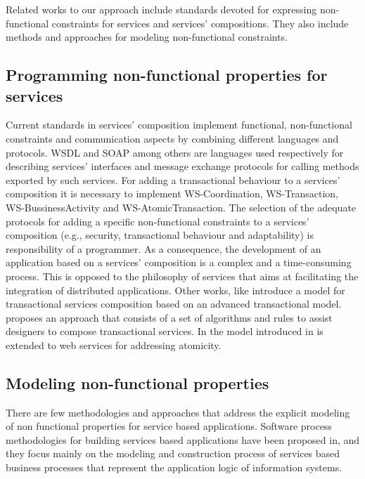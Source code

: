 
Related works to our approach include standards devoted for expressing non-functional constraints for services and services' compositions. They also include methods and approaches for modeling non-functional constraints.

\subsection{Programming non-functional properties for services}
Current standards in services' composition implement functional, non-functional constraints and communication aspects by combining different languages and protocols. WSDL and SOAP among others are languages used respectively for describing services' interfaces and message exchange protocols for calling methods exported by such services. For adding a transactional behaviour to a services' composition it is necessary to implement WS-Coordination, WS-Transaction, WS-BussinessActivity and WS-AtomicTransaction. The selection of the adequate protocols for adding a specific non-functional constraints to a services' composition (e.g., security, transactional behaviour and adaptability) is responsibility of a programmer. As a consequence, the development of an application based on a services' composition is a complex and a time-consuming process. This is opposed to the philosophy of services that aims at facilitating the integration of distributed applications. Other works, like \cite{helga2}
introduce a model for transactional services composition based on
an advanced transactional model. \cite{samy} proposes an approach
that consists of a set of algorithms and rules to assist designers
to compose transactional services. In \cite{Vid04} the model
introduced in \cite{schuldt-etal-TODS} is extended to web services
for addressing atomicity.

\subsection{Modeling non-functional properties}
There are few methodologies and approaches that address the explicit modeling  of non functional
properties for service based applications.   Software process methodologies for
building  services based applications have been proposed in\cite{PapazoglouH06,cdl2006,FeuerlichtM05,Ramollari_asurvey}, and they focus mainly on the modeling and construction process of services based business processes that represent the application logic of information systems.

